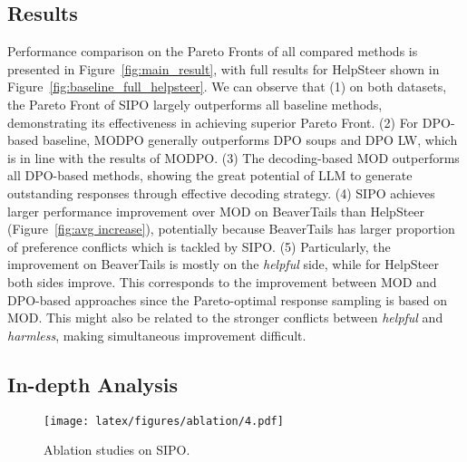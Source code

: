 \subsection{Results}
Performance comparison on the Pareto Fronts of all compared methods is presented in Figure~\ref{fig:main_result}, with full results for HelpSteer shown in Figure~\ref{fig:baseline_full_helpsteer}.
We can observe that
(1) on both datasets, the Pareto Front of SIPO largely outperforms all baseline methods, demonstrating its effectiveness in achieving superior Pareto Front. 
(2) For DPO-based baseline, MODPO generally outperforms DPO soups and DPO LW, which is in line with the results of MODPO. 
(3) The decoding-based MOD outperforms all DPO-based methods, showing the great potential of LLM to generate outstanding responses through effective decoding strategy. 
(4) SIPO achieves larger performance improvement over MOD on BeaverTails than HelpSteer (\cf Figure~\ref{fig:avg increase}), potentially because BeaverTails has larger proportion of preference conflicts which is tackled by SIPO. 
(5) Particularly, the improvement on BeaverTails is mostly on the \emph{helpful} side, while for HelpSteer both sides improve. This corresponds to the improvement between MOD and DPO-based approaches since the Pareto-optimal response sampling is based on MOD. This might also be related to the stronger conflicts between \textit{helpful} and \textit{harmless}, making simultaneous improvement difficult.



\subsection{In-depth Analysis}

\begin{figure}[t]
 \setlength{\abovecaptionskip}{0.05cm}
 \setlength{\belowcaptionskip}{0cm}
    \centering
    \texttt{[image: latex/figures/ablation/4.pdf]}
    \caption{Ablation studies on SIPO.}
    \label{fig:ablation_studies}
\end{figure}

